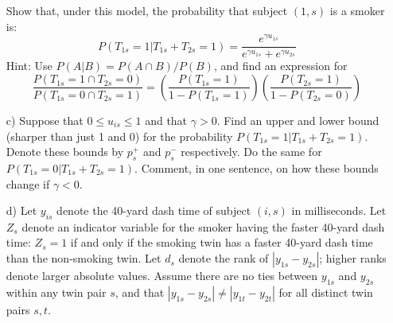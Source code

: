 \documentclass{article}
\begin{document}
\begin{itemize}
          Show that, under this model, the probability
          that subject $(1,s)$ is a smoker is:
          \begin{equation}
            P(T_{1s} = 1| T_{1s} + T_{2s} = 1) 
            = \frac{e^{\gamma u_{1s}}}{e^{\gamma u_{1s}} + e^{\gamma u_{2s}}}
            \label{aprobques}
          \end{equation}
          Hint: Use $P(A | B) = P(A\cap B)/P(B)$, and find an expression for
          $$
            \frac{P(T_{1s} = 1 \cap T_{2s} = 0)}{P(T_{1s} = 0 \cap T_{2s} = 1)} = 
            \left(\frac{P(T_{1s} = 1)}{1 - P(T_{1s} = 1)}\right)
            \left(\frac{P(T_{2s} = 1)}{1 - P(T_{2s} = 0)}\right)
          $$
        \item[c)]
          Suppose that $0 \leq u_{is} \leq 1$ and that $\gamma > 0$.
          Find an upper and lower bound (sharper than just 1 and 0) for the probability
          $P(T_{1s} = 1| T_{1s} + T_{2s} = 1).$
          Denote these bounds by $p^+_s$ and $p^-_s$ respectively.
          Do the same for $P(T_{1s} = 0| T_{1s} + T_{2s} = 1).$
          Comment, in one sentence, on how these bounds change if $\gamma < 0$.
        \item[d)]
          Let $y_{is}$ denote the 40-yard dash time of subject $(i,s)$ in milliseconds.
          Let $Z_s$ denote an indicator variable for the smoker having the faster 40-yard dash time:
          $Z_s = 1$ if and only if the smoking twin 
          has a faster 40-yard dash time than the non-smoking twin.
          Let $d_s$ denote the rank of $|y_{1s} - y_{2s}|$; 
          higher ranks denote larger absolute values.
          Assume there are no ties between $y_{1s}$ and $y_{2s}$ within any 
          twin pair $s$,
          and that $|y_{1s} - y_{2s}| \neq |y_{1t} - y_{2t}|$ for all distinct twin pairs $s,t$.
          

\end{itemize}
\end{document}

